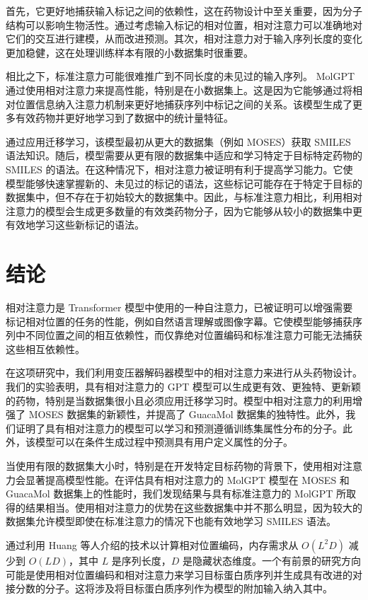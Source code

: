 \begin{translation}
首先，它更好地捕获输入标记之间的依赖性，这在药物设计中至关重要，因为分子结构可以影响生物活性。通过考虑输入标记的相对位置，相对注意力可以准确地对它们的交互进行建模，从而改进预测。其次，相对注意力对于输入序列长度的变化更加稳健，这在处理训练样本有限的小数据集时很重要。

相比之下，标准注意力可能很难推广到不同长度的未见过的输入序列。 MolGPT 通过使用相对注意力来提高性能，特别是在小数据集上。这是因为它能够通过将相对位置信息纳入注意力机制来更好地捕获序列中标记之间的关系。该模型生成了更多有效药物并更好地学习到了数据中的统计量特征。

通过应用迁移学习，该模型最初从更大的数据集（例如 MOSES）获取 SMILES 语法知识。随后，模型需要从更有限的数据集中适应和学习特定于目标特定药物的 SMILES 的语法。在这种情况下，相对注意力被证明有利于提高学习能力。它使模型能够快速掌握新的、未见过的标记的语法，这些标记可能存在于特定于目标的数据集中，但不存在于初始较大的数据集中。因此，与标准注意力相比，利用相对注意力的模型会生成更多数量的有效类药物分子，因为它能够从较小的数据集中更有效地学习这些新标记的语法。

\section{结论}

相对注意力是 Transformer 模型中使用的一种自注意力，已被证明可以增强需要标记相对位置的任务的性能，例如自然语言理解或图像字幕。它使模型能够捕获序列中不同位置之间的相互依赖性，而仅靠绝对位置编码和标准注意力可能无法捕获这些相互依赖性。

在这项研究中，我们利用变压器解码器模型中的相对注意力来进行从头药物设计。我们的实验表明，具有相对注意力的 GPT 模型可以生成更有效、更独特、更新颖的药物，特别是当数据集很小且必须应用迁移学习时。模型中相对注意力的利用增强了 MOSES 数据集的新颖性，并提高了 GuacaMol 数据集的独特性。此外，我们证明了具有相对注意力的模型可以学习和预测遵循训练集属性分布的分子。此外，该模型可以在条件生成过程中预测具有用户定义属性的分子。

当使用有限的数据集大小时，特别是在开发特定目标药物的背景下，使用相对注意力会显著提高模型性能。在评估具有相对注意力的 MolGPT 模型在 MOSES 和 GuacaMol 数据集上的性能时，我们发现结果与具有标准注意力的 MolGPT 所取得的结果相当。使用相对注意力的优势在这些数据集中并不那么明显，因为较大的数据集允许模型即使在标准注意力的情况下也能有效地学习 SMILES 语法。

通过利用 Huang 等人介绍的技术以计算相对位置编码，内存需求从 $O(L^2D)$ 减少到 $O(LD)$，其中 $L$ 是序列长度，$D$ 是隐藏状态维度。一个有前景的研究方向可能是使用相对位置编码和相对注意力来学习目标蛋白质序列并生成具有改进的对接分数的分子。这将涉及将目标蛋白质序列作为模型的附加输入纳入其中。


\end{translation}
